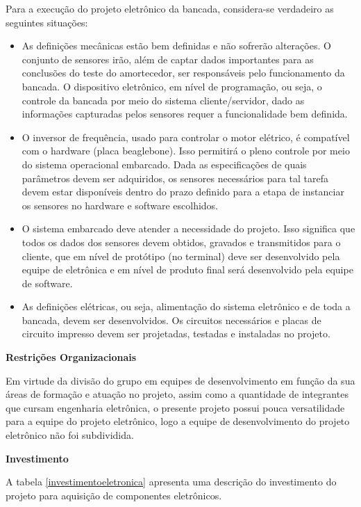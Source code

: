 	Para a execução do projeto eletrônico da bancada, considera-se verdadeiro as seguintes situações:
	\begin{itemize}

	\item As definições mecânicas estão bem definidas e não sofrerão alterações. O conjunto de sensores irão, além de captar dados importantes para as conclusões do teste do amortecedor, ser responsáveis pelo funcionamento da bancada. O dispositivo eletrônico, em nível de programação, ou seja, o controle da bancada por meio do sistema cliente/servidor, dado as informações capturadas pelos sensores requer a funcionalidade bem definida.
	\item O inversor de frequência, usado para controlar o motor elétrico, é compatível com o hardware (placa beaglebone). Isso permitirá o pleno controle por meio do sistema operacional embarcado.
	Dada as especificações de quais parâmetros devem ser adquiridos, os sensores necessários para tal tarefa devem estar disponíveis dentro do prazo definido para a etapa de instanciar os sensores no hardware e software escolhidos.
	\item O sistema embarcado deve atender a necessidade do projeto. Isso significa que todos os dados dos sensores devem obtidos, gravados e transmitidos para o cliente, que em nível de protótipo (no terminal) deve ser desenvolvido pela equipe de eletrônica e em nível de produto final será desenvolvido pela equipe de software.
	\item As definições elétricas, ou seja, alimentação do sistema eletrônico e de toda a bancada, devem ser desenvolvidos. Os circuitos necessários e placas de circuito impresso devem ser projetadas, testadas e instaladas no projeto.

	\end{itemize}

	\textbf{Restrições Organizacionais}

	Em virtude da divisão do grupo em equipes de desenvolvimento em função da sua áreas de formação e atuação no projeto, assim como a quantidade de integrantes que cursam engenharia eletrônica, o presente projeto possui pouca versatilidade para a equipe do projeto eletrônico, logo a equipe de desenvolvimento do projeto eletrônico não foi subdividida.

	\textbf{Investimento}

	A tabela \ref{investimentoeletronica} apresenta uma descrição do investimento do projeto para aquisição de componentes eletrônicos.

